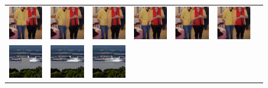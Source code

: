 \begin{figure}[h!]
\begin{tabular}{ccccccc}
\includegraphics[width=.14\textwidth]{figures/imagenet/imagenet_0034_pm.jpg}&
\includegraphics[width=.14\textwidth]{figures/imagenet/0034_ce2.jpg}&
\includegraphics[width=.14\textwidth]{figures/imagenet/0034_nps2.jpg}&
\includegraphics[width=.14\textwidth]{figures/imagenet/imagenet_0034_siggraph2017.jpg}&
\includegraphics[width=.14\textwidth]{figures/imagenet/imagenet_0034_g.jpg}&
\includegraphics[width=.14\textwidth]{figures/imagenet/imagenet_0034_synthesized_image.jpg}\\
\includegraphics[width=.14\textwidth]{figures/imagenet/imagenet_0165_input_image.jpg}&
\includegraphics[width=.14\textwidth]{figures/imagenet/imagenet_0165_pm.jpg}&
\includegraphics[width=.14\textwidth]{figures/imagenet/0165_ce2.jpg}&

\end{tabular}
\end{figure}
